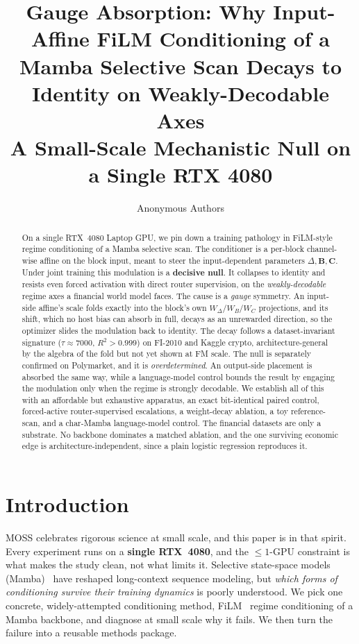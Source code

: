 \documentclass{article}
\title{Gauge Absorption: Why Input-Affine FiLM Conditioning of a Mamba
Selective Scan Decays to Identity on Weakly-Decodable Axes\\
\large A Small-Scale Mechanistic Null on a Single RTX 4080}
\author{Anonymous Authors}
\begin{document}
\maketitle

\ifcolmsubmission
\linenumbers
\fi

\begin{abstract}
On a single RTX~4080 Laptop GPU, we pin down a training pathology in FiLM-style
regime conditioning of a Mamba selective scan. The conditioner is a per-block
channel-wise affine on the block input, meant to steer the input-dependent
parameters $\Delta,\mathbf{B},\mathbf{C}$. Under joint training this modulation is
a \textbf{decisive null}. It collapses to identity and resists even forced
activation with direct router supervision, on the \emph{weakly-decodable} regime
axes a financial world model faces. The cause is a \emph{gauge} symmetry. An
input-side affine's scale folds exactly into the block's own $W_\Delta/W_B/W_C$
projections, and its shift, which no host bias can absorb in full, decays as an
unrewarded direction, so the optimizer slides the modulation back to identity. The decay follows a
dataset-invariant signature ($\tau\approx7000$, $R^2>0.999$) on FI-2010 and Kaggle
crypto, architecture-general by the algebra of the fold but not
yet shown at FM scale. The null is separately confirmed on Polymarket, and it is
\emph{overdetermined}. An output-side placement is absorbed the same way, while a language-model control bounds the
result by engaging the modulation only when the regime is strongly decodable. We
establish all of this with an affordable but exhaustive apparatus, an exact
bit-identical paired control, forced-active router-supervised escalations, a
weight-decay ablation, a toy reference-scan, and a char-Mamba language-model
control. The financial datasets are only a substrate. No backbone dominates a matched
ablation, and the one surviving economic edge is architecture-independent, since a
plain logistic regression reproduces it.
\end{abstract}

\section{Introduction}\label{sec:intro}

MOSS celebrates rigorous science at small scale, and this paper is in that spirit.
Every experiment runs on a \textbf{single RTX~4080}, and the $\le 1$-GPU
constraint is what makes the study clean, not what limits it. Selective state-space
models (Mamba)~\citep{gu2024mamba} have reshaped long-context sequence modeling, but
\emph{which forms of conditioning survive their training dynamics} is poorly
understood. We pick one concrete, widely-attempted conditioning method, FiLM~\citep{perez2018film}
regime conditioning of a Mamba backbone, and diagnose at small scale why it fails.
We then turn the failure into a reusable methods package.
\end{document}
